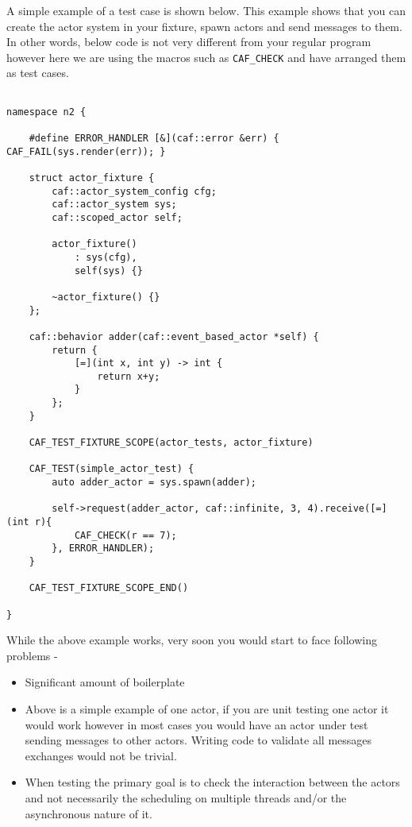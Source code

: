 A simple example of a test case is shown below. This example shows that you can create the actor system in your fixture, spawn actors and send messages to them.
In other words, below code is not very different from your regular program however here we are using the macros such as \lstinline^CAF_CHECK^ and have arranged
them as test cases.

\begin{lstlisting}

namespace n2 {
    
    #define ERROR_HANDLER [&](caf::error &err) { CAF_FAIL(sys.render(err)); }
        
    struct actor_fixture {
        caf::actor_system_config cfg;
        caf::actor_system sys;
        caf::scoped_actor self;
        
        actor_fixture()
            : sys(cfg),
            self(sys) {}
    
        ~actor_fixture() {}
    };
    
    caf::behavior adder(caf::event_based_actor *self) {
        return {
            [=](int x, int y) -> int {
                return x+y;
            }
        };
    }    
        
    CAF_TEST_FIXTURE_SCOPE(actor_tests, actor_fixture)
    
    CAF_TEST(simple_actor_test) {
        auto adder_actor = sys.spawn(adder);
        
        self->request(adder_actor, caf::infinite, 3, 4).receive([=](int r){
            CAF_CHECK(r == 7);
        }, ERROR_HANDLER);
    }
    
    CAF_TEST_FIXTURE_SCOPE_END()
            
}

\end{lstlisting}

While the above example works, very soon you would start to face following problems -

\begin{itemize}

    \item Significant amount of boilerplate
    \item Above is a simple example of one actor, if you are unit testing one actor it would work however in most cases you would have an actor under test sending messages to 
    other actors. Writing code to validate all messages exchanges would not be trivial.
    \item When testing the primary goal is to check the interaction between the actors and not necessarily the scheduling on multiple threads and/or the asynchronous nature of it.
    
\end{itemize}

